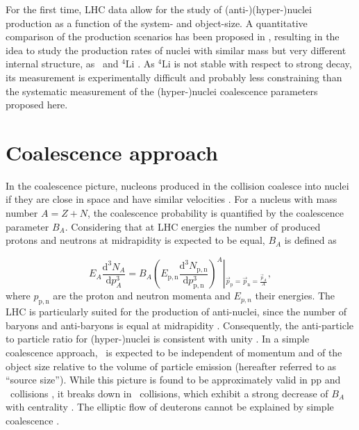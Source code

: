 \documentclass[%
 reprint,
 amsmath,amssymb,
 aps,
]{revtex4-1}
\begin{document}
\indent For the first time, LHC data allow for the study of \mbox{(anti-)(hyper-)nuclei} production as a function of the system- and object-size. 
A quantitative comparison of the production scenarios has been proposed in \cite{Mrowczynski:2016xqm}, resulting in the idea  to study the production rates of nuclei with similar mass but very different internal structure, as \hefour~and ${}^{4}\mathrm{Li}$ \cite{Bazak:2018hgl}. 
As ${}^{4}\mathrm{Li}$ is not stable with respect to strong decay, its measurement is experimentally difficult and probably less constraining than the systematic measurement of the (hyper-)nuclei coalescence parameters proposed here.

 
\section{Coalescence approach} \label{sec:coalescence}
In the coalescence picture, nucleons produced in the collision coalesce into nuclei if they are close in space and have similar velocities \cite{Butler:1963,Kapusta:1980}. 
For a nucleus with mass number $A = Z + N$, the coalescence probability is quantified by the coalescence parameter $B_{A}$.
Considering that at LHC energies the number of produced protons and neutrons at midrapidity is expected to be equal,  $B_{A}$ is defined as

\begin{equation}
E_{A}\frac{\mathrm{d}^{3}N_{A}}{\mathrm{d}p_{A}^{3}}=B_{A}{\left(E_{\mathrm{p,n}}\frac{\mathrm{d}^{3}N_{\mathrm{p,n}}}{\mathrm{d}p_{\mathrm{p,n}}^{3}}\right)^{A}}\left\vert_{\vec{p}_{\mathrm{p}}=\vec{p}_{\mathrm{n}}=\frac{\vec{p}_{A}}{A}} \right.,
\label{eq:BA}
\end{equation}
%
where $p_{\mathrm{p,n}}$ are the proton and neutron momenta and $E_{p,n}$ their energies.
%
The LHC is particularly suited for the production of anti-nuclei, since the number of baryons and anti-baryons is equal at midrapidity \cite{Abbas:2013rua}. Consequently, the anti-particle to particle ratio for \mbox{(hyper-)nuclei} is consistent with unity \cite{ALICE:nucleipp2017, anielski-HQ14, Acharya:2017dmc, Adam:2015yta}.
In a simple coalescence approach, \bA~is expected to be independent of momentum and of the object size relative to the volume of particle emission (hereafter referred to as ``source size'').
While this picture is found to be approximately valid in pp and \pPb~collisions \cite{ALICE:nucleipp2017, anielski-HQ14}, it breaks down in \PbPb~collisions, which exhibit a strong decrease of $B_{A}$ with centrality \cite{ALICE:deuteronppPbPb2015}. 
The elliptic flow of deuterons cannot be explained by simple coalescence \cite{Acharya:2017dmc}. 
\end{document}
